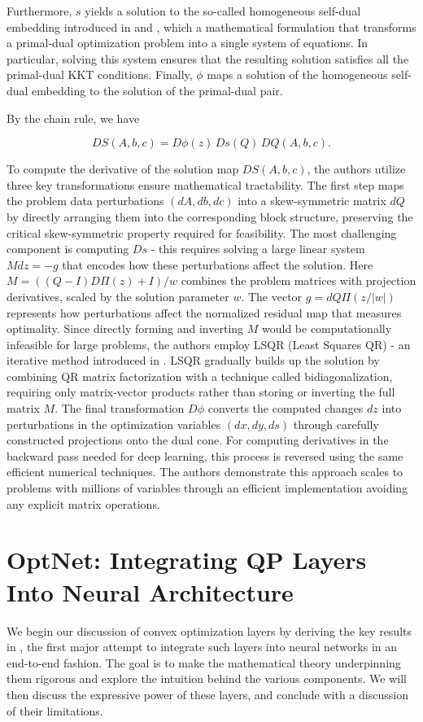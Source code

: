 \documentclass{article}
\begin{document}
Furthermore, $s$ yields a solution to the so-called homogeneous self-dual embedding introduced in \citet{Yeselfdualemb} and \citet{Xuselfdualemb}, which a mathematical formulation  that transforms a primal-dual optimization problem into a single system of equations. In particular, solving this system ensures that the resulting solution satisfies all the primal-dual KKT conditions. Finally, $\phi$ maps a solution of the homogeneous self-dual embedding to the solution of the primal-dual pair. 

By the chain rule, we have 

\[
DS(A, b, c) = D\phi(z) \, Ds(Q) \, DQ(A, b, c).
\]

To compute the derivative of the solution map $DS(A,b,c)$, the authors utilize three key transformations ensure mathematical tractability. The first step maps the problem data perturbations $(dA,db,dc)$ into a skew-symmetric matrix $dQ$ by directly arranging them into the corresponding block structure, preserving the critical skew-symmetric property required for feasibility. The most challenging component is computing $Ds$ - this requires solving a large linear system $Mdz = -g$ that encodes how these perturbations affect the solution. Here $M = ((Q-I)D\Pi(z)+I)/w$ combines the problem matrices with projection derivatives, scaled by the solution parameter $w$. The vector $g = dQ\Pi(z/|w|)$ represents how perturbations affect the normalized residual map that measures optimality. Since directly forming and inverting $M$ would be computationally infeasible for large problems, the authors employ LSQR (Least Squares QR) - an iterative method introduced in \citet{lsqr}. LSQR gradually builds up the solution by combining QR matrix factorization with a technique called bidiagonalization, requiring only matrix-vector products rather than storing or inverting the full matrix $M$. The final transformation $D\phi$ converts the computed changes $dz$ into perturbations in the optimization variables $(dx,dy,ds)$ through carefully constructed projections onto the dual cone. For computing derivatives in the backward pass needed for deep learning, this process is reversed using the same efficient numerical techniques. The authors demonstrate this approach scales to problems with millions of variables through an efficient implementation avoiding any explicit matrix operations.

\section{OptNet: Integrating QP Layers Into Neural Architecture}
We begin our discussion of convex optimization layers by deriving the key results in \citet{optnet}, the first major attempt to integrate such layers into neural networks in an end-to-end fashion. The goal is to make the mathematical theory underpinning them rigorous and explore the intuition behind the various components. We will then discuss the expressive power of these layers, and conclude with a discussion of their limitations. 
\end{document}
